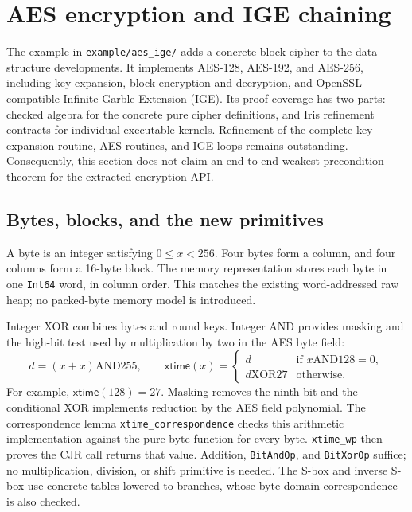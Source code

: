 \section{AES encryption and IGE chaining}
\label{sec:aes}

The example in \texttt{example/aes\_ige/} adds a concrete block cipher to the
data-structure developments. It implements AES-128, AES-192, and AES-256,
including key expansion, block encryption and decryption, and
OpenSSL-compatible Infinite Garble Extension (IGE). Its proof coverage has
two parts: checked algebra for the concrete pure cipher definitions, and Iris
refinement contracts for individual executable kernels. Refinement of the
complete key-expansion routine, AES routines, and IGE loops remains outstanding.
Consequently, this section does not claim an end-to-end weakest-precondition
theorem for the extracted encryption API.

\subsection{Bytes, blocks, and the new primitives}

A byte is an integer satisfying \(0\leq x<256\). Four bytes form a column,
and four columns form a 16-byte block. The memory representation stores each
byte in one \texttt{Int64} word, in column order. This matches the existing
word-addressed raw heap; no packed-byte memory model is introduced.

Integer XOR combines bytes and round keys. Integer AND provides masking and
the high-bit test used by multiplication by two in the AES byte field:
\[
 d=(x+x)\mathbin{\mathrm{AND}}255,\qquad
 \mathsf{xtime}(x)=
 \begin{cases}
 d & \text{if }x\mathbin{\mathrm{AND}}128=0,\\
 d\mathbin{\mathrm{XOR}}27 & \text{otherwise}.
 \end{cases}
\]
For example, \(\mathsf{xtime}(128)=27\). Masking removes the ninth bit and
the conditional XOR implements reduction by the AES field polynomial.
The correspondence lemma \texttt{xtime\_correspondence} checks this arithmetic
implementation against the pure byte function for every byte.
\texttt{xtime\_wp} then proves the CJR call returns that value. Addition,
\texttt{BitAndOp}, and \texttt{BitXorOp} suffice; no multiplication, division,
or shift primitive is needed. The S-box and inverse S-box use concrete tables
lowered to branches, whose byte-domain correspondence is also checked.

